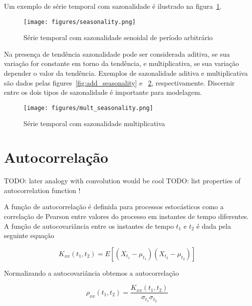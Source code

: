 Um exemplo de série temporal com sazonalidade é ilustrado na
figura~\ref{fig:seasonality}.

\begin{figure}[H]
    \centering
    \texttt{[image: figures/seasonality.png]}
    \caption{Série temporal com sazonalidade senoidal de período arbitrário}
    \label{fig:seasonality}
\end{figure}

Na presença de tendência sazonalidade pode ser considerada aditiva, se sua
variação for constante em torno da tendência, e multiplicativa, se sua variação
depender o valor da tendência. Exemplos de sazonalidade aditiva e
multiplicativa são dados pelas figures~\ref{fig:add_seasonality} e
~\ref{fig:mult_seasonality}, respectivamente. Discernir entre os dois tipos de
sazonalidade é importante para modelagem.


\begin{figure}[H]
    \centering
    \texttt{[image: figures/mult\_seasonality.png]}
    \caption{Série temporal com sazonalidade multiplicativa}
    \label{fig:mult_seasonality}
\end{figure}


\section{Autocorrelação}

TODO: later analogy with convolution would be cool
TODO: list properties of autocorrelation function !

A função de autocorrelação é definida para processos estocásticos como a
correlação de Pearson entre valores do processo em instantes de tempo
diferentes. A função de autocovariância entre os instantes de tempo $t_1$ e
$t_2$ é dada pela seguinte equação

\begin{equation}\label{eq:raw_autocorr}
    K_{xx}(t_1, t_2) = E[(X_{t_1} - \mu_{t_1})(X_{t_2} -\mu_{t_2})]
\end{equation}

Normalizando a autocovariância obtemos a autocorrelação

$$\rho_{xx}(t_1, t_2) =\frac{K_{xx}(t_1, t_2)}{\sigma_{t_1}\sigma_{t_2}}$$

